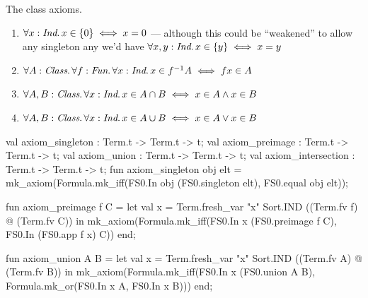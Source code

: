\begin{node}
The class axioms.
\begin{enumerate}
  \item $\forall x:\textit{Ind}\ldotp x\in\{0\}\iff x=0$ --- although
    this could be ``weakened'' to allow any singleton any we'd have
    $\forall x,y:\textit{Ind}\ldotp x\in\{y\}\iff x=y$
  \item $\forall A:\textit{Class}\ldotp\forall f:\textit{Fun}\ldotp\forall x:\textit{Ind}\ldotp x\in f^{-1}A\iff fx\in A$
  \item $\forall A,B : \textit{Class}\ldotp\forall x:\textit{Ind}\ldotp x\in A\cap B\iff x\in A\land x\in B$
  \item $\forall A,B : \textit{Class}\ldotp\forall x:\textit{Ind}\ldotp x\in A\cup B\iff x\in A\lor x\in B$
\end{enumerate}
\end{node}

\nwenddocs{}\plusendmoddef\nwstartdeflinemarkup{}\nwenddeflinemarkup
val axiom_singleton : Term.t -> Term.t -> t;
val axiom_preimage : Term.t -> Term.t -> t;
val axiom_union : Term.t -> Term.t -> t;
val axiom_intersection : Term.t -> Term.t -> t;
\nwendcode{}\nwdocspar
\nwenddocs{}\plusendmoddef\nwstartdeflinemarkup{}\nwenddeflinemarkup
fun axiom_singleton obj elt =
  mk_axiom(Formula.mk_iff(FS0.In obj (FS0.singleton elt),
                          FS0.equal obj elt));

fun axiom_preimage f C =
  let val x = Term.fresh_var "x" Sort.IND ((Term.fv f) @ (Term.fv C))
  in mk_axiom(Formula.mk_iff(FS0.In x (FS0.preimage f C),
                             FS0.In (FS0.app f x) C))
  end;

fun axiom_union A B =
  let val x = Term.fresh_var "x" Sort.IND ((Term.fv A) @ (Term.fv B))
  in mk_axiom(Formula.mk_iff(FS0.In x (FS0.union A B),
                             Formula.mk_or(FS0.In x A,
                                           FS0.In x B)))
  end;

